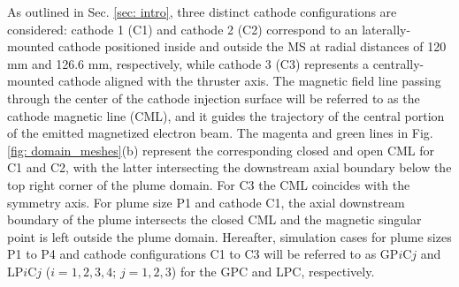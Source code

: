 \documentclass[%
 aip,
cha,
 amsmath,amssymb,
 reprint,%
]{revtex4-1}
\begin{document}
As outlined in Sec. \ref{sec: intro}, three distinct cathode configurations are considered: cathode 1 (C1) and cathode 2 (C2) correspond to an laterally-mounted cathode positioned inside and outside the MS at radial distances of 120 mm and 126.6 mm, respectively, while cathode 3 (C3) represents a centrally-mounted cathode aligned with the thruster axis. 
The magnetic field line passing through the center of the cathode injection surface will be referred to as the cathode magnetic line (CML), and it guides the trajectory of the central portion of the emitted magnetized electron beam.
The magenta and green lines in Fig. \ref{fig: domain_meshes}(b) represent the corresponding closed and open CML for C1 and C2, with the latter intersecting the downstream axial boundary below the top right corner of the plume domain. For C3 the CML coincides with the symmetry axis.
%
For plume size P1 and cathode C1, the axial downstream boundary of the plume intersects the closed CML and the magnetic singular point is left outside the plume domain. 
%
Hereafter, simulation cases for plume sizes P1 to P4 and cathode configurations C1 to C3 will be referred to as GP$i$C$j$ and LP$i$C$j$ ($i = 1, 2, 3, 4$; $j=1,2, 3$) for the GPC and LPC, respectively.




\begin{table}[!t]
\centering
{}
\caption{Main mesh parameters (values separated by commas correspond to plume sizes P1 to P4).}
\label{tab: HET_sim_par}
\end{table} 
\end{document}
